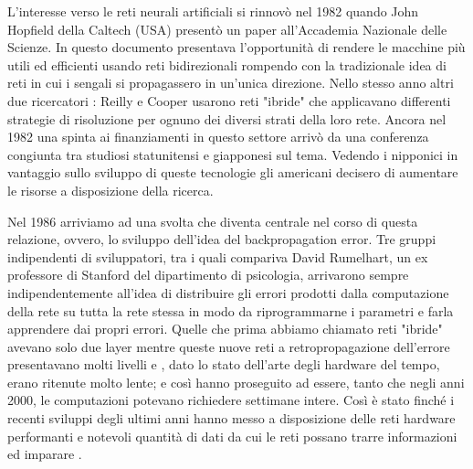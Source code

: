 L'interesse verso le reti neurali artificiali si rinnovò nel 1982 quando  John Hopfield della Caltech (USA) presentò un paper all'Accademia Nazionale delle Scienze. In questo documento presentava l'opportunità di rendere le macchine più utili ed efficienti usando reti bidirezionali rompendo con la tradizionale idea di reti in cui i sengali si propagassero in un'unica direzione. Nello stesso anno altri due ricercatori : Reilly e Cooper usarono reti "ibride" che applicavano differenti strategie di risoluzione per ognuno dei diversi strati della loro rete. Ancora nel 1982 una spinta ai finanziamenti in questo settore arrivò da una conferenza congiunta tra studiosi statunitensi e giapponesi sul tema. Vedendo i nipponici in vantaggio sullo sviluppo di queste tecnologie gli americani decisero di aumentare le risorse a disposizione della ricerca.

Nel 1986 arriviamo ad una svolta che diventa centrale nel corso di questa relazione, ovvero, lo sviluppo dell'idea del backpropagation error. Tre gruppi indipendenti di sviluppatori, tra i quali compariva David Rumelhart, un ex professore di Stanford del dipartimento di psicologia, arrivarono sempre indipendentemente all'idea  di distribuire gli errori prodotti dalla computazione della rete su tutta la rete stessa in modo da riprogrammarne i parametri e farla apprendere dai propri errori.
Quelle che prima abbiamo chiamato reti "ibride" avevano solo due layer mentre queste nuove reti a retropropagazione dell'errore presentavano molti livelli e , dato lo stato dell'arte degli hardware del tempo, erano ritenute molto lente; e così hanno proseguito ad essere, tanto che negli anni 2000, le computazioni potevano richiedere settimane intere. Così è stato finché i recenti sviluppi degli ultimi anni hanno messo a disposizione delle reti hardware performanti e notevoli quantità di dati da cui le reti possano trarre informazioni ed imparare \cite{stanford_history}.

